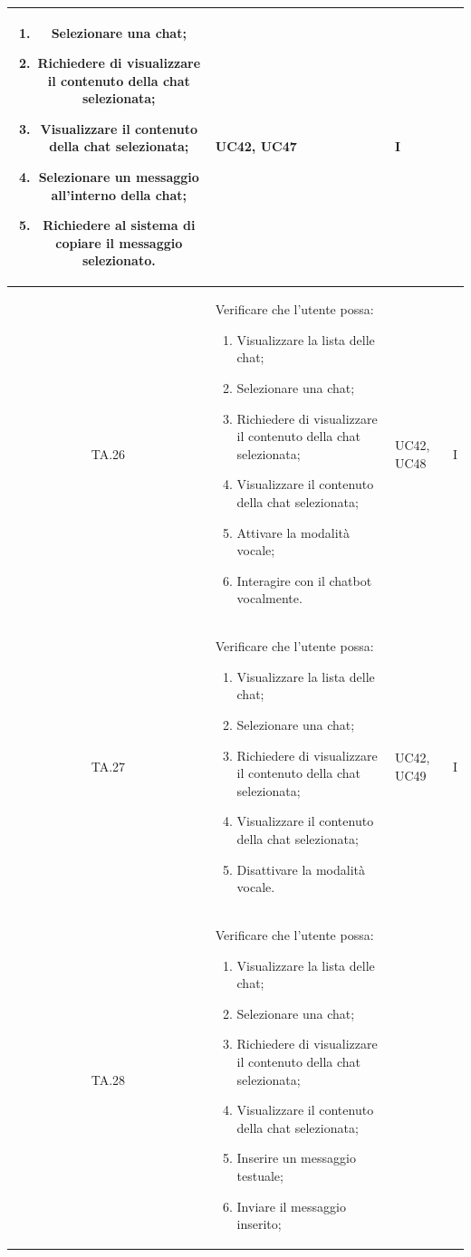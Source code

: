 \begin{xltabular}{\textwidth}{|c|X|p{2.5cm}|c|}
\begin{enumerate}
    \item Selezionare una chat;
    \item Richiedere di visualizzare il contenuto della chat selezionata;
    \item Visualizzare il contenuto della chat selezionata;
    \item Selezionare un messaggio all'interno della chat;
    \item Richiedere al sistema di copiare il messaggio selezionato.
\end{enumerate}
& UC42, UC47 & I \\
\hline
TA.26 & Verificare che l'utente possa:
\begin{enumerate}
    \item Visualizzare la lista delle chat;
    \item Selezionare una chat;
    \item Richiedere di visualizzare il contenuto della chat selezionata;
    \item Visualizzare il contenuto della chat selezionata;
    \item Attivare la modalità vocale;
    \item Interagire con il chatbot vocalmente.
\end{enumerate}
& UC42, UC48 & I \\
\hline
TA.27 & Verificare che l'utente possa:
\begin{enumerate}
    \item Visualizzare la lista delle chat;
    \item Selezionare una chat;
    \item Richiedere di visualizzare il contenuto della chat selezionata;
    \item Visualizzare il contenuto della chat selezionata;
    \item Disattivare la modalità vocale.
\end{enumerate}
& UC42, UC49 & I \\
\hline
TA.28 & Verificare che l'utente possa:
\begin{enumerate}
    \item Visualizzare la lista delle chat;
    \item Selezionare una chat;
    \item Richiedere di visualizzare il contenuto della chat selezionata;
    \item Visualizzare il contenuto della chat selezionata;
    \item Inserire un messaggio testuale;
    \item Inviare il messaggio inserito;

\end{enumerate}
\end{xltabular}
